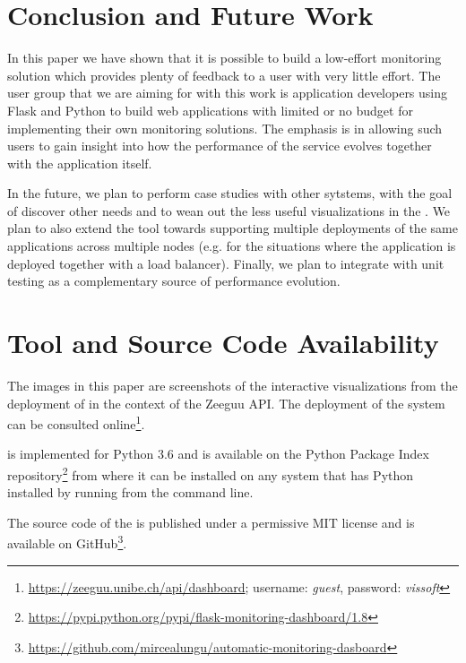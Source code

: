 \documentclass[conference]{IEEEtran}
\begin{document}



\section{Conclusion and Future Work}

In this paper we have shown that it is possible to build a low-effort monitoring solution which provides plenty of feedback to a user with very little effort. The user group that we are aiming for with this work is application developers using Flask and Python to build web applications with limited or no budget for implementing their own monitoring solutions. The emphasis is in allowing such users to gain insight into how the performance of the service evolves together with the application itself.

In the future, we plan to perform case studies with other sytstems, with the goal of discover other needs and to wean out the less useful visualizations in the \tool. We plan to also extend the tool towards supporting multiple deployments of the same applications across multiple nodes (e.g. for the situations where the application is deployed together with a load balancer). Finally, we plan to integrate \tool with unit testing as a complementary source of performance evolution.

  \section{Tool and Source Code Availability}
  \label{sec:install}

    The images in this paper are screenshots of the interactive visualizations from the deployment of \tool in the context of the Zeeguu API. The deployment of the system can be consulted online\footnote{\url{https://zeeguu.unibe.ch/api/dashboard}; username: {\em guest}, password: {\em vissoft}}.

    \tool is implemented for Python 3.6 and is available on the Python Package Index repository\footnote{\url{https://pypi.python.org/pypi/flask-monitoring-dashboard/1.8}} from where it can be installed on any system that has Python installed by running \install from the command line. 

    The source code of the \tool is published under a permissive MIT license and is available on GitHub\footnote{\url{https://github.com/mircealungu/automatic-monitoring-dasboard}}.







\end{document}
